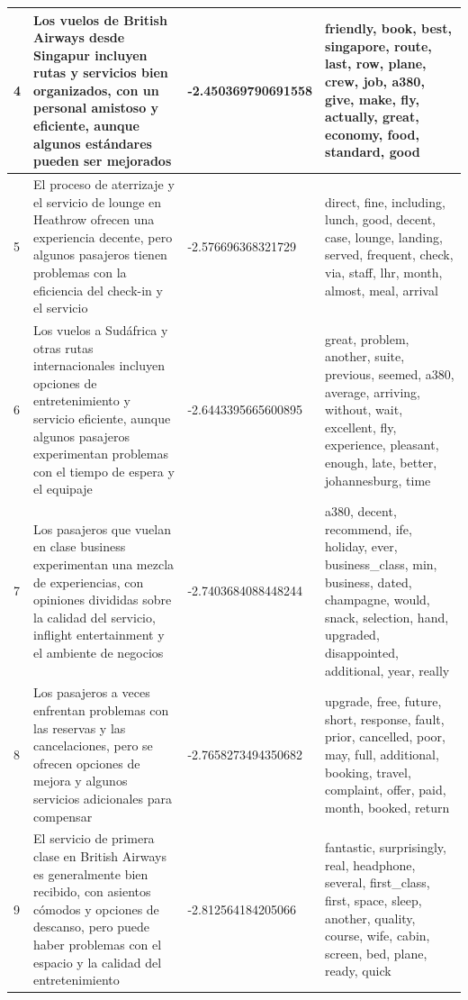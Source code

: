 \documentclass{report}
\begin{document}
{\begin{longtable}{|p{1cm}|p{4cm}|p{4cm}|p{6cm}|}
                    \hline
                    4 & Los vuelos de British Airways desde Singapur incluyen rutas y servicios bien organizados, con un personal amistoso y eficiente, aunque algunos estándares pueden ser mejorados & -2.450369790691558 & friendly, book, best, singapore, route, last, row, plane, crew, job, a380, give, make, fly, actually, great, economy, food, standard, good \\
                    \hline
                    5 & El proceso de aterrizaje y el servicio de lounge en Heathrow ofrecen una experiencia decente, pero algunos pasajeros tienen problemas con la eficiencia del check-in y el servicio & -2.576696368321729 & direct, fine, including, lunch, good, decent, case, lounge, landing, served, frequent, check, via, staff, lhr, month, almost, meal, arrival \\
                    \hline
                    6 & Los vuelos a Sudáfrica y otras rutas internacionales incluyen opciones de entretenimiento y servicio eficiente, aunque algunos pasajeros experimentan problemas con el tiempo de espera y el equipaje & -2.6443395665600895 & great, problem, another, suite, previous, seemed, a380, average, arriving, without, wait, excellent, fly, experience, pleasant, enough, late, better, johannesburg, time \\
                    \hline
                    7 & Los pasajeros que vuelan en clase business experimentan una mezcla de experiencias, con opiniones divididas sobre la calidad del servicio, inflight entertainment y el ambiente de negocios & -2.7403684088448244 & a380, decent, recommend, ife, holiday, ever, business\_class, min, business, dated, champagne, would, snack, selection, hand, upgraded, disappointed, additional, year, really \\
                    \hline
                    8 & Los pasajeros a veces enfrentan problemas con las reservas y las cancelaciones, pero se ofrecen opciones de mejora y algunos servicios adicionales para compensar & -2.7658273494350682 & upgrade, free, future, short, response, fault, prior, cancelled, poor, may, full, additional, booking, travel, complaint, offer, paid, month, booked, return \\
                    \hline
                    9 & El servicio de primera clase en British Airways es generalmente bien recibido, con asientos cómodos y opciones de descanso, pero puede haber problemas con el espacio y la calidad del entretenimiento & -2.812564184205066 & fantastic, surprisingly, real, headphone, several, first\_class, first, space, sleep, another, quality, course, wife, cabin, screen, bed, plane, ready, quick \\

\end{longtable}}
\end{document}
